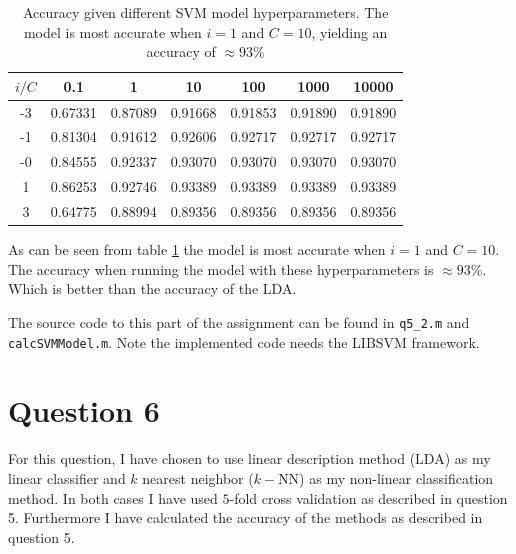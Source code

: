 \documentclass[10pt]{article}
\begin{document}
\begin{table}
  \begin{center}  
    \begin{tabular}{ | c | c | c | c | c | c | c |}
      \hline
       $i/C$   & 0.1          & 1             & 10           & 100           & 1000          &     10000\\ \hline
       -3 & 0.67331           & 0.87089       & 0.91668      & 0.91853       & 0.91890       &     0.91890\\ \hline
       -1 & 0.81304           & 0.91612       & 0.92606      & 0.92717       & 0.92717       &     0.92717\\ \hline            
       -0 & 0.84555           & 0.92337       & 0.93070      & 0.93070       & 0.93070       &     0.93070\\ \hline      
       1  & 0.86253           & 0.92746       & 0.93389      & 0.93389       & 0.93389       &     0.93389\\ \hline      
       3  & 0.64775           & 0.88994       & 0.89356      & 0.89356       & 0.89356       &     0.89356\\ \hline      
    \end{tabular}
    \caption{Accuracy given different SVM model hyperparameters. The model is most accurate when $i=1$ and $C=10$, yielding an accuracy of $\approx 93\%$}
    \label{table4}
  \end{center}    
\end{table}   
As can be seen from table \ref{table4} the model is most accurate when $i=1$ and $C=10$. The accuracy when running the model with these hyperparameters is $\approx 93\%$. Which is better than the accuracy of the LDA.

The source code to this part of the assignment can be found in \texttt{q5\_2.m} and \texttt{calcSVMModel.m}. Note the implemented code needs the LIBSVM framework\cite{libsvm}. 


\section*{Question 6} %
\label{sec:question_6}

For this question, I have chosen to use linear description method (LDA) as my linear classifier and $k$ nearest neighbor ($k-$NN) as my non-linear classification method. In both cases I have used $5$-fold cross validation as described in question 5. Furthermore I have calculated the accuracy of the methods as described in question 5.  
\end{document}
